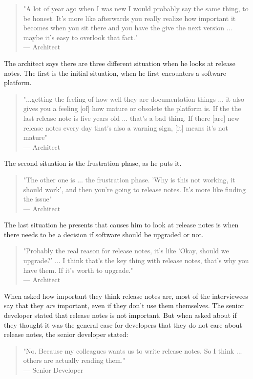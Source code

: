 \documentclass{cslthse-msc}
\begin{document}
    \begin{quote}
        "A lot of year ago when I was new I would probably say the same thing, to be honest. It's more like afterwards you really realize how important it becomes when you sit there and you have the give the next version ... maybe it's easy to overlook that fact."\\
        --- Architect
    \end{quote}
    The architect says there are three different situation when he looks at release notes. The first is the initial situation, when he first encounters a software platform.
    \begin{quote}
        "...getting the feeling of how well they are documentation things ... it also gives you a feeling [of] how mature or obsolete the platform is. If the the last release note is five years old ... that's a bad thing. If there [are] new release notes every day that's also a warning sign, [it] means it's not mature" \\
        --- Architect
    \end{quote}
    The second situation is the frustration phase, as he puts it.
    \begin{quote}
        "The other one is ... the frustration phase. 'Why is this not working, it should work', and then you're going to release notes. It's more like finding the issue"\\
        --- Architect
    \end{quote}
    The last situation he presents that causes him to look at release notes is when there needs to be a decision if software should be upgraded or not.
    \begin{quote}
        "Probably the real reason for release notes, it's like 'Okay, should we upgrade?' ... I think that's the key thing with release notes, that's why you have them. If it's worth to upgrade." \\
        --- Architect
    \end{quote}
    When asked how important they think release notes are, most of the interviewees say that they \textit{are} important, even if they don't use them themselves. The senior developer stated that release notes is not important. But when asked about if they thought it was the general case for developers that they do not care about release notes, the senior developer stated:
    \begin{quote}
        "No. Because my colleagues wants us to write release notes. So I think ... others are actually reading them."\\ --- Senior Developer
    \end{quote}
\end{document}
